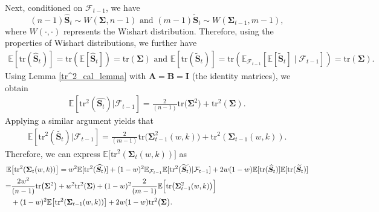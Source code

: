 Next, conditioned on $\mathcal{F}_{t-1}$, we have
$$
(n-1)\widehat{\bm{S}}_t \sim W(\bm{\Sigma},n-1)
\mbox{ and }
(m-1)\widetilde{\bm{S}}_t \sim W(\bm{\Sigma}_{t-1},m-1),
$$
where $W(\cdot,\cdot)$ represents the Wishart distribution. Therefore, using the properties of Wishart distributions, we further have
\begin{align*}
    \mathbb{E}[\mathrm{tr}(\widehat{\bm S}_t)] = \mathrm{tr}(\mathbb{E}[\widehat{\bm S}_t]) = \mathrm{tr}(\bm{\Sigma}) \mbox{ and }
    \mathbb{E}[\mathrm{tr}(\widetilde{\bm S}_t)] 
    = \mathrm{tr}(\mathbb{E}_{\mathcal{F}_{t-1}}[\mathbb{E}[\widetilde{\bm S}_t] \mid \mathcal{F}_{t-1}]) 
 = \mathrm{tr}(\bm{\Sigma}).
\end{align*}
Using Lemma \ref{tr^2_cal_lemma} with \(\bm{A} = \bm{B} = \bm{I}\) (the identity matrices), we obtain
\begin{align*}
\mathbb{E}[\mathrm{tr}^2(\widehat{\bm{S}_t})|\mathcal{F}_{t-1}]=\frac{2}{(n-1)}\mathrm{tr}\bigl(\bm{\Sigma}^2\bigr)
   + \mathrm{tr}^2(\bm{\Sigma}).
\end{align*}
Applying a similar argument yields that
\begin{align*}
\mathbb{E}[\mathrm{tr}^2(\widetilde{\bm{S}_t})|\mathcal{F}_{t-1}]=\frac{2}{(m-1)}\mathrm{tr}\bigl(\bm{\Sigma}_{t-1}^2(w,k)\bigr)
   + \mathrm{tr}^2(\bm{\Sigma}_{t-1}(w,k)).
\end{align*}
Therefore, we can express $\mathbb{E}\bigl[\mathrm{tr}^2(\bm{\Sigma}_t(w,k))\bigr]$ as 
\begin{align}
\label{MulB1}
    \mathbb{E}&\bigl[\mathrm{tr}^2(\bm{\Sigma}_t(w,k))\bigr]
    = w^2\mathbb{E}[\mathrm{tr}^2(\widehat{\bm{S}_t})]+(1-w)^2\mathbb{E}_{\mathcal{F}_{t-1}}\mathbb{E}[\mathrm{tr}^2(\widetilde{\bm{S}_t})|\mathcal{F}_{t-1}]+2w(1-w)\mathbb{E}[\mathrm{tr}(\widehat{\bm S}_t)]\mathbb{E}[\mathrm{tr}(\widetilde{\bm S}_t)] \notag \\
    =& \frac{2w^2}{(n-1)}\mathrm{tr}\bigl(\bm{\Sigma}^2\bigr) + {w^2}\mathrm{tr}^2(\bm{\Sigma})  + (1-w)^2 \frac{2}{(m-1)} \mathbb{E}\Bigl[\mathrm{tr}\bigl(\bm{\Sigma}_{t-1}^2(w,k)\bigr)\Bigr] \notag\\& + (1-w)^2 \mathbb{E}\bigl[\mathrm{tr}^2(\bm{\Sigma}_{t-1}(w,k))\bigr]  +2w(1-w) \mathrm{tr}^2\bigl(\bm{\Sigma}\bigr).
\end{align}

